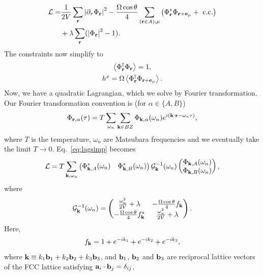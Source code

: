 \documentclass[twocolumn,superscriptaddress,amsmath,amssymb,aps,prx,nofootinbib]{revtex4-2}
\begin{document}
\begin{equation}
\label{eq:lagsimp}
\begin{aligned}
    \mathcal{L}=&\frac{1}{2V}\sum_{\vb{r}}\abs{\partial_\tau \Phi_{\vb{r}}}^2 - \frac{\Omega \cos \theta}{4} \sum_{(\vb{r}\in A),\mu}\left(\Phi_{\vb{r}}^* \Phi_{\vb{r}+\vb{e}_\mu}+\text{ c.c.}\right)\\& + \lambda\sum_{\vb{r}} (\abs{\Phi_{\vb{r}}}^2-1).
    \end{aligned}
\end{equation}
The constraints now simplify to
 \begin{gather}
     \expval{\Phi^\dagger_{\vb{r}}\Phi_{\vb{r}}}=1 \label{eq:constrsimp1},  \\
     h^x=\Omega\expval{\Phi^\dagger_{\vb{r}}\Phi_{\vb{r}+\vb{e}_\mu}}. \label{eq:constrsimp2}
 \end{gather}
 Now, we have a quadratic Lagrangian, which we solve by Fourier transformation. Our Fourier transformation convention is (for $\alpha \in \{A,B\}$)
 \begin{equation}
     \Phi_{\vb{r},\alpha}(\tau)=T\sum_{\omega_n}\sum_{\vb{k}\in BZ}\Phi_{\vb{k},\alpha}(\omega_n)e^{i(\vb{k}\cdot \vb{r}-\omega_n \tau)},
 \end{equation}
where $T$ is the temperature, $\omega_n$ are Matsubara frequencies and we eventually take the limit $T \to 0$. Eq.~\eqref{eq:lagsimp} becomes
\begin{equation}
   \mathcal{L}= T \sum_{\vb{k},\omega_n}\begin{pmatrix}\Phi^*_{\vb{k},A}(\omega_n) & \Phi^*_{\vb{k},B}(\omega_n)\end{pmatrix} \mathcal{G}^{-1}_{\vb{k}}(\omega_n) \begin{pmatrix}\Phi_{\vb{k},A}(\omega_n) \\ \Phi_{\vb{k},B}(\omega_n)\end{pmatrix},
\end{equation}
where 
\begin{equation}
    \mathcal{G}^{-1}_{\vb{k}}(\omega_n)=\begin{pmatrix}\frac{\omega_n^2}{2V}+\lambda & -\frac{\Omega \cos \theta}{4}f_{\vb{k}}\\-\frac{\Omega \cos \theta}{4}f^*_{\vb{k}} & \frac{\omega_n^2}{2V}+\lambda\end{pmatrix}.
\end{equation}
Here,
\begin{equation}
    f_{\vb{k}}=1+e^{-i k_1} +e^{-i k_2} + e^{-i k_3},
\end{equation}
where $\vb{k}\equiv k_1 \vb{b}_1 + k_2 \vb{b}_2 + k_3 \vb{b}_3$, and $\vb{b}_1$, $\vb{b}_2$ and $\vb{b}_3$ are reciprocal lattice vectors of the FCC lattice satisfying $\vb{a}_i \cdot \vb{b}_j =\delta_{ij}$.
\end{document}
